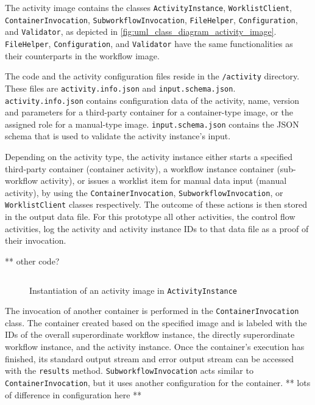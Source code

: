     The activity image contains the classes \texttt{ActivityInstance}, \texttt{WorklistClient}, \texttt{ContainerInvocation}, \texttt{SubworkflowInvocation}, \texttt{FileHelper}, \texttt{Configuration}, and \texttt{Validator}, as depicted in \ref{fig:uml_class_diagram_activity_image}.
    \texttt{FileHelper}, \texttt{Configuration}, and \texttt{Validator} have the same functionalities as their counterparts in the workflow image.

    The code and the activity configuration files reside in the \texttt{/activity} directory. These files are \texttt{activity.info.json} and \texttt{input.schema.json}. \texttt{activity.info.json} contains configuration data of the activity, \eg name, version and parameters for a third-party container for a container-type image, or the assigned role for a manual-type image. \texttt{input.schema.json} contains the \ac{JSON} schema that is used to validate the activity instance's input.

    Depending on the activity type, the activity instance either starts a specified third-party container (container activity), a workflow instance container (sub-workflow activity), or issues a worklist item for manual data input (manual activity), by using the \texttt{ContainerInvocation}, \texttt{SubworkflowInvocation}, or \texttt{WorklistClient} classes respectively. The outcome of these actions is then stored in the output data file. For this prototype all other activities, \ie the control flow activities, log the activity and activity instance \acp{ID} to that data file as a proof of their invocation.

    ** other code?

    \begin{figure}[htbp]
      \inputminted[firstline=18,lastline=27,fontsize=\footnotesize,linenos=true,numberblanklines=true,showspaces=false,breaklines=true,baselinestretch=1,gobble=2]{ruby}{../code/ac_base/run.rb}
      \caption[]{Instantiation of an activity image in \texttt{ActivityInstance}}
      \label{fig:main_logic_of_ac_instance}
    \end{figure}

    The invocation of another container is performed in the \texttt{ContainerInvocation} class. The container created based on the specified image and is labeled with the \acp{ID} of the overall superordinate workflow instance, the directly superordinate workflow instance, and the activity instance.
    Once the container's execution has finished, its standard output stream and error output stream can be accessed with the \texttt{results} method. \texttt{SubworkflowInvocation} acts similar to \texttt{ContainerInvocation}, but it uses another configuration for the container. ** lots of difference in configuration here **

